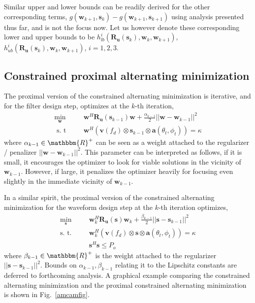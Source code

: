 \documentclass[11pt,draftclsnofoot,onecolumn]{IEEEtran}
\theoremstyle{definition}
\theoremstyle{remark}
\begin{document}
 Similar upper and lower bounds can be readily derived for the other corresponding terms,  $g(\mathbf{w}_{k+1},\mathbf{s}_k)-g(\mathbf{w}_{k+1},\mathbf{s}_{k+1})$ using analysis presented thus far, and is not the focus now. Let us however denote these corresponding lower and upper bounds to be $h_{lb}^i (\mathbf{R_u}( \mathbf{s}_k), \mathbf{w}_k, \mathbf{w}_{k+1})$, $ h_{ub}^i (\mathbf{R_u}( \mathbf{s}_k), \mathbf{w}_k, \mathbf{w}_{k+1})$, $i=1,2,3$.

\subsection{Constrained proximal alternating minimization}
The proximal version of the constrained alternating minimization is iterative, and for the filter design step, optimizes at the $k$-th iteration,
\begin{align} \label{eq41}
\min_{\mathbf{w} }\;\;\;\;\; &\mathbf{w}^H\mathbf{R_u}( \mathbf{s}_{k-1})\mathbf{w}+\frac{\alpha_{k-1}}{2} || \mathbf{w}-\mathbf{w}_{k-1} ||^2\\
\mbox{ s. t } \;\;\;\;\;&\mathbf{w}^H(\mathbf{v}(f_d)\otimes\mathbf{s}_{k-1}\otimes\mathbf{a}(\theta_t,\phi_t))=\kappa \nonumber
\end{align}
where $\alpha_{k-1} \in \mathbbm{R}^{+}$ can be seen as a weight attached to the regularizer / penalizer  $|| \mathbf{w}-\mathbf{w}_{k-1} ||^2$. This parameter can be interpreted as follows, if it is small,  it encourages the optimizer to look for viable solutions in the vicinity of $\mathbf{w}_{k-1}$. However, if large, it penalizes the optimizer heavily for focusing even slightly in the immediate vicinity of  $\mathbf{w}_{k-1}$.

In a similar spirit, the proximal version of the constrained alternating minimization for the waveform design step at the  $k$-th iteration optimizes,
\begin{align} \label{eq42}
\min\limits_{\mathbf{s}} \;\;\;\;\; &\mathbf{w}^H_{k}\mathbf{R_u}(\mathbf{s})\mathbf{w}_{k} +\frac{\beta_{k-1}}{2} ||\mathbf{s}-\mathbf{s}_{k-1} ||^2\nonumber \\
\mbox{s. t. }\;\;\;\;\; & \mathbf{w}^H_{k}(\mathbf{v}(f_d)\otimes\mathbf{s}\otimes\mathbf{a}(\theta_t,\phi_t))=\kappa   \\ 
\;\;\;\;\;\; & \mathbf{s}^H \mathbf{s}\leq P_o \nonumber \nonumber
\end{align}
where $\beta_{k-1}\in\mathbbm{R}^{+}$ is the weight attached to the regularizer $ ||\mathbf{s}-\mathbf{s}_{k-1} ||^2$. Bounds on $\alpha_{k-1},\beta_{k-1}$ relating it to the Lipschitz constants are deferred to forthcoming analysis. A graphical example comparing the constrained alternating minimization and the proximal constrained alternating minimization is shown in Fig.~\ref{amcamfig}.
\end{document}
